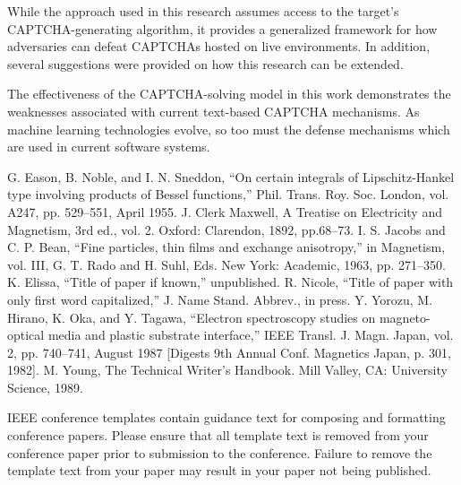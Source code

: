 \documentclass[11pt,conference]{IEEEtran}
\begin{document}
While the approach used in this research assumes access to the target's
CAPTCHA-generating algorithm, it provides a generalized framework for how
adversaries can defeat CAPTCHAs hosted on live environments. In addition,
several suggestions were provided on how this research
can be extended.

The effectiveness of the CAPTCHA-solving model in this work demonstrates the
weaknesses associated with current text-based CAPTCHA mechanisms. As machine
learning technologies evolve, so too must the defense mechanisms which are used
in current software systems.

\begin{thebibliography}{00}
	 G. Eason, B. Noble, and I. N. Sneddon, ``On certain integrals of Lipschitz-Hankel type involving products of Bessel functions,'' Phil. Trans. Roy. Soc. London, vol. A247, pp. 529--551, April 1955.
	 J. Clerk Maxwell, A Treatise on Electricity and Magnetism, 3rd ed., vol. 2. Oxford: Clarendon, 1892, pp.68--73.
	 I. S. Jacobs and C. P. Bean, ``Fine particles, thin films and exchange anisotropy,'' in Magnetism, vol. III, G. T. Rado and H. Suhl, Eds. New York: Academic, 1963, pp. 271--350.
	 K. Elissa, ``Title of paper if known,'' unpublished.
	 R. Nicole, ``Title of paper with only first word capitalized,'' J. Name Stand. Abbrev., in press.
	 Y. Yorozu, M. Hirano, K. Oka, and Y. Tagawa, ``Electron spectroscopy studies on magneto-optical media and plastic substrate interface,'' IEEE Transl. J. Magn. Japan, vol. 2, pp. 740--741, August 1987 [Digests 9th Annual Conf. Magnetics Japan, p. 301, 1982].
	 M. Young, The Technical Writer's Handbook. Mill Valley, CA: University Science, 1989.
\end{thebibliography}
\vspace{12pt}
\color{red}
IEEE conference templates contain guidance text for composing and formatting conference papers. Please ensure that all template text is removed from your conference paper prior to submission to the conference. Failure to remove the template text from your paper may result in your paper not being published.
\end{document}
